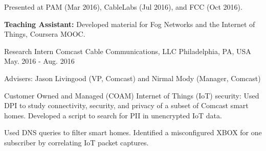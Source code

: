\begin{cventries}
{\begin{cvitems}
{      		}
      \item {Presented at PAM (Mar 2016), CableLabs (Jul 2016), and FCC (Oct 2016).
      		}
%
      \item {\textbf{Teaching Assistant:} Developed material for Fog Networks and the Internet of Things, Coursera MOOC.
      		}
      \end{cvitems}
    }

  \cventry
    {Research Intern} %
    {Comcast Cable Communications, LLC} %
    {Philadelphia, PA, USA} %
    {May. 2016 - Aug. 2016} %
    {
      \begin{cvitems} %
      \item {Advisers: Jason Livingood (VP, Comcast) and Nirmal Mody (Manager, Comcast)}
%      
      \item {Customer Owned and Managed (COAM) Internet of Things (IoT) security: Used DPI to study connectivity, security, and privacy of a subset of Comcast smart homes. Developed a script to search for PII in unencrypted IoT data.}
      \item {Used DNS queries to filter smart homes. Identified a misconfigured XBOX for one subscriber by correlating IoT packet captures.}
%      
      \end{cvitems}
    }


\end{cventries}
